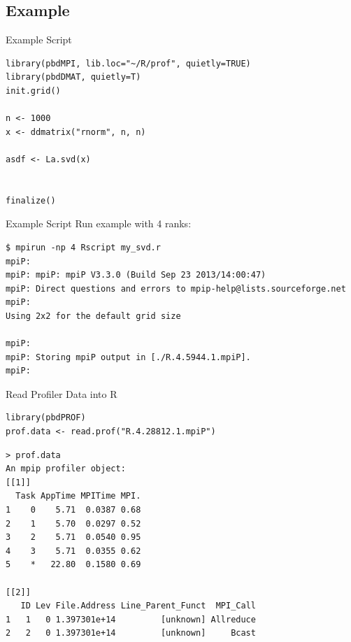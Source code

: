 \subsection{Example}

\begin{frame}[fragile]
  \begin{block}{Example Script}
\begin{lstlisting}[title=my\_svd.r]
library(pbdMPI, lib.loc="~/R/prof", quietly=TRUE)
library(pbdDMAT, quietly=T)
init.grid()

n <- 1000
x <- ddmatrix("rnorm", n, n)

asdf <- La.svd(x)


finalize()
\end{lstlisting}
  \end{block}
\end{frame}

\begin{frame}[fragile]
  \begin{block}{Example Script}
Run example with 4 ranks:
\begin{lstlisting}[language=shl]
$ mpirun -np 4 Rscript my_svd.r
mpiP: 
mpiP: mpiP: mpiP V3.3.0 (Build Sep 23 2013/14:00:47)
mpiP: Direct questions and errors to mpip-help@lists.sourceforge.net
mpiP: 
Using 2x2 for the default grid size

mpiP: 
mpiP: Storing mpiP output in [./R.4.5944.1.mpiP].
mpiP: 
\end{lstlisting}
  \end{block}
\end{frame}



\begin{frame}[fragile]
  \begin{block}{Read Profiler Data into R}
\vspace{-.2cm}
\begin{lstlisting}[title=Interactively (or in batch) Read in Profiler Data]
library(pbdPROF)
prof.data <- read.prof("R.4.28812.1.mpiP") 
\end{lstlisting}
\vspace{-.2cm}
\begin{lstlisting}[language=shl,title=Partial Output of Example Data]
> prof.data
An mpip profiler object:
[[1]]
  Task AppTime MPITime MPI.
1    0    5.71  0.0387 0.68
2    1    5.70  0.0297 0.52
3    2    5.71  0.0540 0.95
4    3    5.71  0.0355 0.62
5    *   22.80  0.1580 0.69

[[2]]
   ID Lev File.Address Line_Parent_Funct  MPI_Call
1   1   0 1.397301e+14         [unknown] Allreduce
2   2   0 1.397301e+14         [unknown]     Bcast
\end{lstlisting}
  \end{block}
\end{frame}




